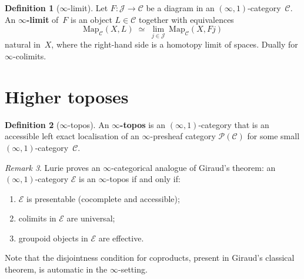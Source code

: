 \documentclass[a4paper,12pt]{book}
\theoremstyle{definition}
\newtheorem{definition}{Definition}[section]
\theoremstyle{plain}
\theoremstyle{remark}
\newtheorem{remark}[definition]{Remark}
\begin{document}
\begin{definition}[$\infty$-limit]\label{def:infty-limit}
Let $F\colon\mathcal{J}\to\mathcal{C}$ be a diagram in an
$(\infty,1)$-category~$\mathcal{C}$.  An \textbf{$\infty$-limit}
of~$F$ is an object $L\in\mathcal{C}$ together with equivalences
\[
    \mathrm{Map}_\mathcal{C}(X, L)
    \;\simeq\;
    \lim_{j\in\mathcal{J}}\, \mathrm{Map}_\mathcal{C}(X, Fj)
\]
natural in~$X$, where the right-hand side is a homotopy limit of spaces.
Dually for $\infty$-colimits.
\end{definition}



\section{Higher toposes}\label{sec:higher-toposes}


\begin{definition}[$\infty$-topos]\label{def:infty-topos}
An \textbf{$\infty$-topos} is an $(\infty,1)$-category that is an
accessible left exact localisation of an $\infty$-presheaf category
$\mathcal{P}(\mathcal{C})$ for some small $(\infty,1)$-category~$\mathcal{C}$.
\end{definition}

\begin{remark}\label{rem:infty-topos-giraud}
Lurie proves an $\infty$-categorical analogue of Giraud's theorem:
an $(\infty,1)$-category $\mathcal{E}$ is an $\infty$-topos if and only if:
\begin{enumerate}[label=(\roman*)]
\item $\mathcal{E}$ is presentable (cocomplete and accessible);
\item colimits in $\mathcal{E}$ are universal;
\item groupoid objects in $\mathcal{E}$ are effective.
\end{enumerate}
Note that the disjointness condition for coproducts, present in Giraud's
classical theorem, is automatic in the $\infty$-setting.
\end{remark}
\end{document}
